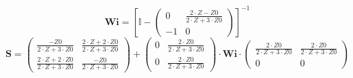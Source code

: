 \[ \mathbf{Wi} =  \left[ \mathbb{I}  - \left(\begin{array}{cc} 0 &
\frac{2\cdot Z-Z0}{2\cdot Z+3\cdot Z0} \\ -1 & 0 \end{array}\right)
\right]^{-1}  \]
\[ \mathbf{S} = \left(\begin{array}{cc} \frac{-Z0}{2\cdot Z+3\cdot Z0}
& \frac{2\cdot Z+2\cdot Z0}{2\cdot Z+3\cdot Z0} \\ \frac{2\cdot
Z+2\cdot Z0}{2\cdot Z+3\cdot Z0} & \frac{-Z0}{2\cdot Z+3\cdot Z0}
\end{array}\right) + \left(\begin{array}{cc} 0 & \frac{2\cdot
Z0}{2\cdot Z+3\cdot Z0} \\ 0 & \frac{2\cdot Z0}{2\cdot Z+3\cdot Z0}
\end{array}\right) \cdot \mathbf{Wi} \cdot\left(\begin{array}{cc}
\frac{2\cdot Z0}{2\cdot Z+3\cdot Z0} & \frac{2\cdot Z0}{2\cdot
Z+3\cdot Z0} \\ 0 & 0 \end{array}\right) \]
